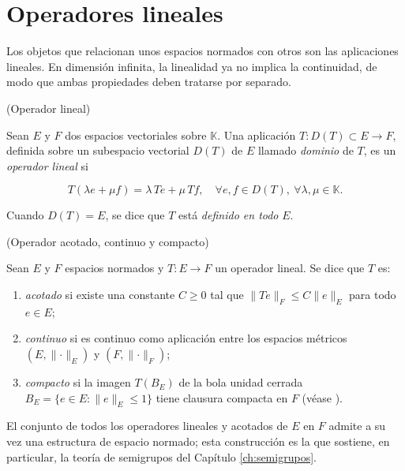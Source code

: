 \section{Operadores lineales}
\label{ch:preliminares:section:operadores}

Los objetos que relacionan unos espacios normados con otros son las aplicaciones
lineales. En dimensión infinita, la linealidad ya no implica la continuidad, de
modo que ambas propiedades deben tratarse por separado.\\

\begin{Definicion}{(Operador lineal)}
\label{ch:preliminares:def:operadorLineal}

Sean $E$ y $F$ dos espacios vectoriales sobre $\mathbb{K}$. Una aplicación
$T : D(T) \subset E \rightarrow F$, definida sobre un subespacio vectorial $D(T)$
de $E$ llamado \textit{dominio} de $T$, es un \textit{operador lineal} si

\[T(\lambda e + \mu f) = \lambda \, Te + \mu \, Tf, \quad \forall e, f \in D(T), \ \forall \lambda, \mu \in \mathbb{K}.\]

Cuando $D(T) = E$, se dice que $T$ está \textit{definido en todo} $E$.
\end{Definicion}

\begin{Definicion}{(Operador acotado, continuo y compacto)}
\label{ch:preliminares:def:operadorAcotado}

Sean $E$ y $F$ espacios normados y $T : E \rightarrow F$ un operador lineal. Se
dice que $T$ es:

\begin{enumerate}
    \item \textit{acotado} si existe una constante $C \geq 0$ tal que
    $\lVert Te \rVert_F \leq C \lVert e \rVert_E$ para todo $e \in E$;

    \item \textit{continuo} si es continuo como aplicación entre los espacios
    métricos $(E, \lVert \cdot \rVert_E)$ y $(F, \lVert \cdot \rVert_F)$;

    \item \textit{compacto} si la imagen $T(B_E)$ de la bola unidad cerrada
    $B_E = \{e \in E : \lVert e \rVert_E \leq 1\}$ tiene clausura compacta en $F$
    (véase \cite[Cap.~6]{brezis-2011-fun-ana-sob}).
\end{enumerate}
\end{Definicion}

El conjunto de todos los operadores lineales y acotados de $E$ en $F$ admite a su
vez una estructura de espacio normado; esta construcción es la que sostiene, en
particular, la teoría de semigrupos del Capítulo \ref{ch:semigrupos}.\\

